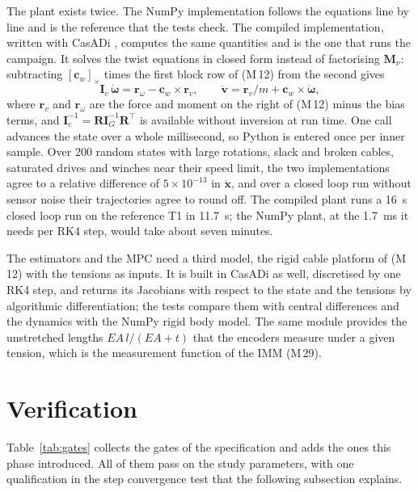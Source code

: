 \documentclass[10pt]{article}
\newcommand{\vc}[1]{\bm{#1}}
\newcommand{\mt}[1]{\mathbf{#1}}
\newcommand{\sk}[1]{[#1]_{\times}}
\begin{document}
The plant exists twice. The NumPy implementation follows the equations line by line and is the reference that the tests check. The compiled implementation, written with CasADi \citep{andersson2019casadi}, computes the same quantities and is the one that runs the campaign. It solves the twist equations in closed form instead of factorising $\mt M_\nu$: subtracting $\sk{\vc c_w}$ times the first block row of (M\,12) from the second gives
\begin{equation}\label{eq:closedform}
\mt I_c\,\dot{\vc\omega}=\vc r_\omega-\vc c_w\times\vc r_v,\qquad \dot{\vc v}=\vc r_v/m+\vc c_w\times\dot{\vc\omega},
\end{equation}
where $\vc r_v$ and $\vc r_\omega$ are the force and moment on the right of (M\,12) minus the bias terms, and $\mt I_c^{-1}=\mt R\mt I_G^{-1}\mt R^\top$ is available without inversion at run time. One call advances the state over a whole millisecond, so Python is entered once per inner sample. Over 200 random states with large rotations, slack and broken cables, saturated drives and winches near their speed limit, the two implementations agree to a relative difference of $5\times10^{-13}$ in $\dot{\vc x}$, and over a closed loop run without sensor noise their trajectories agree to round off. The compiled plant runs a 16~s closed loop run on the reference T1 in 11.7~s; the NumPy plant, at the 1.7~ms it needs per RK4 step, would take about seven minutes.

The estimators and the MPC need a third model, the rigid cable platform of (M\,12) with the tensions as inputs. It is built in CasADi as well, discretised by one RK4 step, and returns its Jacobians with respect to the state and the tensions by algorithmic differentiation; the tests compare them with central differences and the dynamics with the NumPy rigid body model. The same module provides the unstretched lengths $EA\,l/(EA+t)$ that the encoders measure under a given tension, which is the measurement function of the IMM (M\,29).

\section{Verification}\label{sec:verification}

Table~\ref{tab:gates} collects the gates of the specification and adds the ones this phase introduced. All of them pass on the study parameters, with one qualification in the step convergence test that the following subsection explains.
\end{document}
